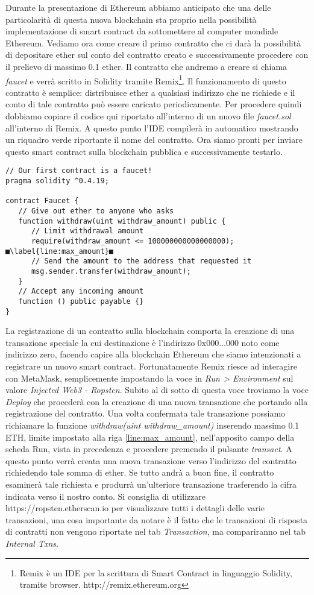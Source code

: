 Durante la presentazione di Ethereum abbiamo anticipato che una delle particolarità di questa nuova blockchain sta proprio nella possibilità implementazione di smart contract da sottomettere al computer mondiale Ethereum. Vediamo ora come creare il primo contratto che ci darà la possibilità di depositare ether sul conto del contratto creato e successivamente procedere con il prelievo di massimo 0.1 ether. Il contratto che andremo a creare si chiama \textit{faucet} e verrà scritto in Solidity tramite Remix\footnote{Remix è un IDE per la scrittura di Smart Contract in linguaggio Solidity, tramite browser. http://remix.ethereum.org}. Il funzionamento di questo contratto è semplice: distribuisce ether a qualsiasi indirizzo che ne richiede e il conto di tale contratto può essere caricato periodicamente. Per procedere quindi dobbiamo copiare il codice qui riportato all'interno di un nuovo file \textit{faucet.sol} all'interno di Remix. A questo punto l'IDE compilerà in automatico mostrando un riquadro verde riportante il nome del contratto. Ora siamo pronti per inviare questo smart contract sulla blockchain pubblica e successivamente testarlo.
\begin{lstlisting}
// Our first contract is a faucet!
pragma solidity ^0.4.19;

contract Faucet {
   // Give out ether to anyone who asks
   function withdraw(uint withdraw_amount) public {
      // Limit withdrawal amount
      require(withdraw_amount <= 100000000000000000);	■\label{line:max_amount}■
      // Send the amount to the address that requested it
      msg.sender.transfer(withdraw_amount);
   }
   // Accept any incoming amount
   function () public payable {}
}
\end{lstlisting}
La registrazione di un contratto sulla blockchain comporta la creazione di una transazione speciale la cui destinazione è l'indirizzo $0\text{x}000 \dots 000$ noto come indirizzo zero, facendo capire alla blockchain Ethereum che siamo intenzionati a registrare un nuovo smart contract. Fortunatamente Remix riesce ad interagire con MetaMask, semplicemente impostando la voce in \textit{Run > Environment} sul valore \textit{Injected Web3 - Ropsten}. Subito al di sotto di questa voce troviamo la voce \textit{Deploy} che procederà con la creazione di una nuova transazione che portando alla registrazione del contratto. Una volta confermata tale transazione possiamo richiamare la funzione \textit{withdraw(uint withdraw\_amount)} inserendo massimo 0.1 ETH, limite impostato alla riga \ref{line:max_amount}, nell'apposito campo della scheda Run, vista in precedenza e procedere premendo il pulsante \textit{transact}. A questo punto verrà creata una nuova transazione verso l'indirizzo del contratto richiedendo tale somma di ether. Se tutto andrà a buon fine, il contratto esaminerà tale richiesta e produrrà un'ulteriore transazione trasferendo la cifra indicata verso il nostro conto. Si consiglia di utilizzare https://ropsten.etherscan.io per visualizzare tutti i dettagli delle varie transazioni, una cosa importante da notare è il fatto che le transazioni di risposta di contratti non vengono riportate nel tab \textit{Transaction}, ma compariranno nel tab \textit{Internal Txns}.

